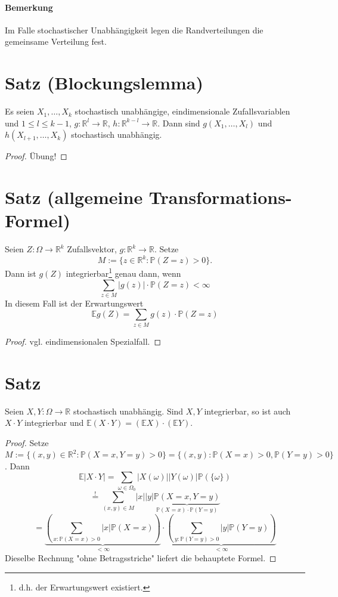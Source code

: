 \documentclass[a4paper,11pt,notitlepage]{report}
\newcommand{\R}{{\ensuremath{\mathbb{R}}}}
\newcommand{\Prim}{{\ensuremath{\mathbb{P}}}}
\newcommand{\E}{{\ensuremath{\mathbb{E}}}}
\begin{document}
\paragraph{Bemerkung}
Im Falle stochastischer Unabhängigkeit legen die Randverteilungen die gemeinsame Verteilung fest.

\section{Satz (Blockungslemma)}
Es seien $X_1, \ldots, X_k$ stochastisch unabhängige, eindimensionale Zufallsvariablen und $1 \leq l \leq k-1$, $g \colon \R^l \rightarrow \R$, $h \colon \R^{k-l} \rightarrow \R$. Dann sind 
$g(X_1, \ldots, X_l)$ und $h(X_{l+1}, \ldots, X_k)$ stochastisch unabhängig.

\begin{proof}
Übung!
\end{proof}

\section{Satz (allgemeine Transformations-Formel)}
Seien $Z \colon \Omega \rightarrow \R^k$ Zufallsvektor, $g \colon \R^k \rightarrow \R$. Setze
$$M := \{ z \in \R^k \colon \Prim(Z=z)>0\}.$$
Dann ist $g(Z)$ integrierbar\footnote{d.h. der Erwartungswert existiert.} genau dann, wenn
$$\sum\limits_{z \in M}{|g(z)| \cdot \Prim(Z=z)} < \infty$$
In diesem Fall ist der Erwartungswert
$$\mathbb{E} g(Z) = \sum\limits_{z \in M}{g(z) \cdot \Prim(Z=z)}$$

\begin{proof}
vgl. eindimensionalen Spezialfall.
\end{proof}

\section{Satz}
Seien $X, Y \colon \Omega \rightarrow \R$ stochastisch unabhängig.
Sind $X,Y$ integrierbar, so ist auch $X \cdot Y$ integrierbar und $\mathbb{E}(X \cdot Y) = (\mathbb{E} X)\cdot(\mathbb{E} Y)$.

\begin{proof}
	Setze $M := \{(x,y) \in \R^2 \colon \Prim(X=x, Y=y) > 0 \} = \{(x,y) \colon \Prim(X=x) > 0, \Prim(Y=y) > 0\}$.
	Dann 
	$$\E | X \cdot Y | =  \sum\limits_{\omega \in \Omega_0}{|X(\omega)| |Y(\omega)| \Prim(\{\omega\})}$$
	$$\overset{!}{=} \sum\limits_{(x,y) \in M}{|x| |y| \underbrace{\Prim(X=x, Y=y)}_{\Prim(X=x) \cdot \Prim(Y=y)}}$$
	$$= \underbrace{\left(\sum\limits_{x \colon \Prim(X=x)>0}{|x| \Prim(X=x)}\right)}_{< \infty} \cdot \underbrace{\left(\sum\limits_{y \colon \Prim(Y=y)>0}{|y| \Prim(Y=y)}\right)}_{< \infty}$$
	Dieselbe Rechnung "ohne Betragsstriche" liefert die behauptete Formel.
\end{proof}
\end{document}

